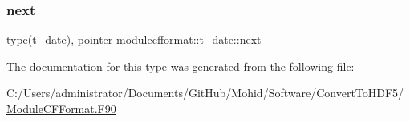 \mbox{\label{structmodulecfformat_1_1t__date_a54d9d7d74e23247529d049058c498d2c}} 
\subsubsection{\texorpdfstring{next}{next}}
{\footnotesize\ttfamily type(\mbox{\hyperlink{structmodulecfformat_1_1t__date}{t\+\_\+date}}), pointer modulecfformat\+::t\+\_\+date\+::next\hspace{0.3cm}{\ttfamily [private]}}



The documentation for this type was generated from the following file\+:\begin{DoxyCompactItemize}
\item 
C\+:/\+Users/administrator/\+Documents/\+Git\+Hub/\+Mohid/\+Software/\+Convert\+To\+H\+D\+F5/\mbox{\hyperlink{_module_c_f_format_8_f90}{Module\+C\+F\+Format.\+F90}}\end{DoxyCompactItemize}
